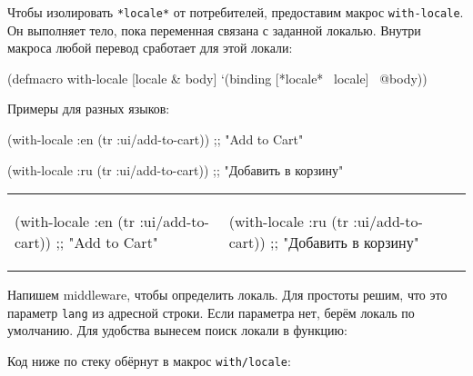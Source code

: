 
Чтобы изолировать \verb|*locale*| от потребителей, предоставим макрос
\verb|with-locale|. Он выполняет тело, пока переменная связана с заданной
локалью. Внутри макроса любой перевод сработает для этой локали:

\begin{english}
  \begin{clojure}
(defmacro with-locale
  [locale & body]
  `(binding [*locale* ~locale]
     ~@body))
  \end{clojure}
\end{english}

Примеры для разных языков:

\ifnarrow

\begin{clojure}
(with-locale :en
  (tr :ui/add-to-cart))
;; "Add to Cart"
\end{clojure}

\splitter

\begin{clojure}
(with-locale :ru
  (tr :ui/add-to-cart))
;; "Добавить в корзину"
\end{clojure}

\else


\noindent
\begin{tabular}{ @{}p{5cm} @{}p{5cm} }

  \begin{clojure}
(with-locale :en
  (tr :ui/add-to-cart))
;; "Add to Cart"
  \end{clojure}

&

  \begin{clojure}
(with-locale :ru
  (tr :ui/add-to-cart))
;; "Добавить в корзину"
  \end{clojure}

\end{tabular}


\fi


Напишем middleware, чтобы определить локаль. Для простоты решим, что это
параметр \verb|lang| из адресной строки. Если параметра нет, берём локаль по
умолчанию. Для удобства вынесем поиск локали в функцию:

Код ниже по стеку обёрнут в макрос \texttt{with\-/locale}:

